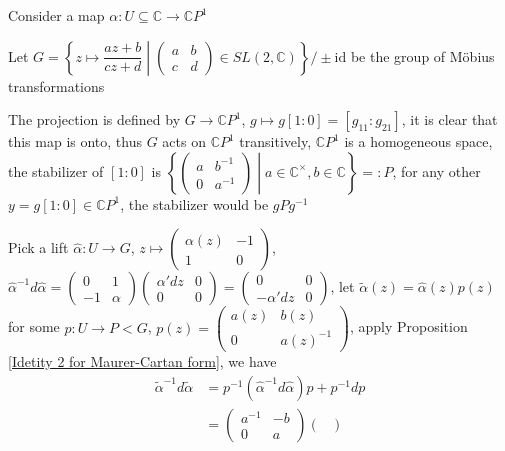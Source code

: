 \documentclass[../main.tex]{subfiles}
\begin{document}
\begin{example}
Consider a map $\alpha:U\subseteq\mathbb C\to\mathbb CP^1$ \par
Let $G=\left\{z\mapsto\dfrac{az+b}{cz+d}\middle|\begin{pmatrix}
a &b \\
c&d
\end{pmatrix}\in SL(2,\mathbb C)\right\}/\pm\mathrm{id}$ be the group of M\"obius transformations \par
The projection is defined by $G\to\mathbb CP^1$, $g\mapsto g[1:0]=[g_{11}:g_{21}]$, it is clear that this map is onto, thus $G$ acts on $\mathbb CP^1$ transitively, $\mathbb CP^1$ is a homogeneous space, the stabilizer of $[1:0]$ is $\left\{\begin{pmatrix}
a &b^{-1} \\
0 & a^{-1}
\end{pmatrix}\middle|a\in\mathbb C^\times,b\in\mathbb C\right\}=:P$, for any other $y=g[1:0]\in\mathbb CP^1$, the stabilizer would be $gPg^{-1}$ \par
Pick a lift $\widehat\alpha:U\to G$, $z\mapsto\begin{pmatrix}
\alpha(z) & -1 \\
1 &0
\end{pmatrix}$, $\widehat\alpha^{-1}d\widehat\alpha=\begin{pmatrix}
0 & 1 \\
-1 &\alpha
\end{pmatrix}\begin{pmatrix}
\alpha'dz & 0 \\
0 &0
\end{pmatrix}=\begin{pmatrix}
0 & 0 \\
-\alpha'dz &0
\end{pmatrix}$, let $\widetilde\alpha(z)=\widehat\alpha(z)p(z)$ for some $p:U\to P<G$, $p(z)=\begin{pmatrix}
a(z) & b(z) \\
0 & a(z)^{-1}
\end{pmatrix}$, apply Proposition \ref{Idetity 2 for Maurer-Cartan form}, we have
\begin{align*}
\widetilde\alpha^{-1}d\widetilde\alpha&=p^{-1}(\widehat\alpha^{-1}d\widehat\alpha)p+p^{-1}dp \\
&=\begin{pmatrix}
a^{-1} & -b \\
0 &a
\end{pmatrix}\begin{pmatrix}

\end{pmatrix}
\end{align*}
\end{example}
\end{document}
